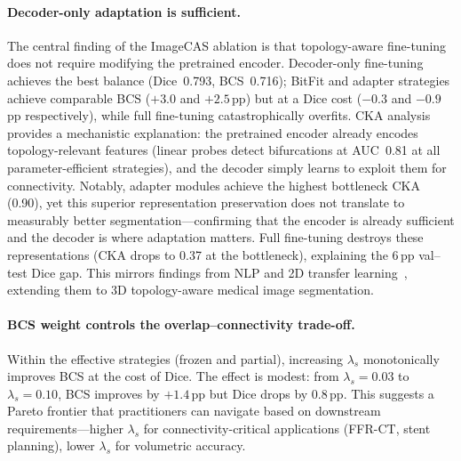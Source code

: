 \documentclass[runningheads]{llncs}
\begin{document}
\paragraph{Decoder-only adaptation is sufficient.}
The central finding of the ImageCAS ablation is that topology-aware fine-tuning does not require modifying the pretrained encoder.
Decoder-only fine-tuning achieves the best balance (Dice~0.793, BCS~0.716); BitFit and adapter strategies achieve comparable BCS ($+3.0$ and $+2.5$\,pp) but at a Dice cost ($-0.3$ and $-0.9$\,pp respectively), while full fine-tuning catastrophically overfits.
CKA analysis provides a mechanistic explanation: the pretrained encoder already encodes topology-relevant features (linear probes detect bifurcations at AUC~0.81 at all parameter-efficient strategies), and the decoder simply learns to exploit them for connectivity.
Notably, adapter modules achieve the highest bottleneck CKA (0.90), yet this superior representation preservation does not translate to measurably better segmentation---confirming that the encoder is already sufficient and the decoder is where adaptation matters.
Full fine-tuning destroys these representations (CKA drops to 0.37 at the bottleneck), explaining the 6\,pp val--test Dice gap.
This mirrors findings from NLP and 2D transfer learning~\cite{kumar_finetuning_2022}, extending them to 3D topology-aware medical image segmentation.

\paragraph{BCS weight controls the overlap--connectivity trade-off.}
Within the effective strategies (frozen and partial), increasing $\lambda_s$ monotonically improves BCS at the cost of Dice.
The effect is modest: from $\lambda_s{=}0.03$ to $\lambda_s{=}0.10$, BCS improves by $+1.4$\,pp but Dice drops by $0.8$\,pp.
This suggests a Pareto frontier that practitioners can navigate based on downstream requirements---higher $\lambda_s$ for connectivity-critical applications (FFR-CT, stent planning), lower $\lambda_s$ for volumetric accuracy.
\end{document}
